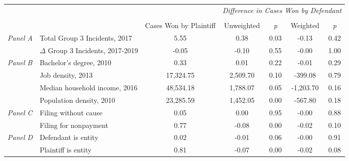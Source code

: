 \begin{tabular}{llccccc}
\toprule
 &  & \textit{} & \multicolumn{4}{c}{\textit{Difference in Cases Won by Defendant}} \\
\cline{4-7}
\\
 &  & Cases Won by Plaintiff & Unweighted & \emph{p} & Weighted & \emph{p} \\
\midrule
\multirow[c]{2}{3cm}{\textit{Panel A}} & Total Group 3 Incidents, 2017 & 5.55 & 0.38 & 0.03 & -0.13 & 0.42 \\
 & $\Delta$ Group 3 Incidents, 2017-2019 & -0.05 & -0.10 & 0.55 & -0.00 & 1.00 \\
\cline{1-7}
\multirow[c]{4}{3cm}{\textit{Panel B}} & Bachelor's degree, 2010 & 0.33 & 0.01 & 0.22 & -0.01 & 0.29 \\
 & Job density, 2013 & 17,324.75 & 2,509.70 & 0.10 & -399.08 & 0.79 \\
 & Median household income, 2016 & 48,534.18 & 1,788.07 & 0.05 & -1,203.70 & 0.16 \\
 & Population density, 2010 & 23,285.59 & 1,452.05 & 0.00 & -567.80 & 0.18 \\
\cline{1-7}
\multirow[c]{2}{3cm}{\textit{Panel C}} & Filing without cause & 0.05 & 0.00 & 0.95 & -0.00 & 0.88 \\
 & Filing for nonpayment & 0.77 & -0.08 & 0.00 & -0.02 & 0.10 \\
\cline{1-7}
\multirow[c]{2}{3cm}{\textit{Panel D}} & Defendant is entity & 0.02 & -0.01 & 0.06 & -0.00 & 0.91 \\
 & Plaintiff is entity & 0.81 & -0.07 & 0.00 & -0.02 & 0.08 \\
\cline{1-7}
\bottomrule
\end{tabular}
